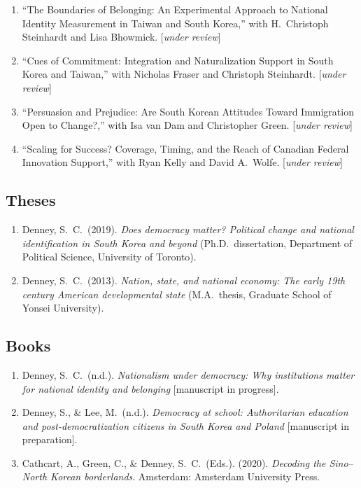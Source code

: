 \documentclass[11pt, a4paper]{article}
\begin{document}
\begin{enumerate}[itemsep=0.15em]
  \item ``The Boundaries of Belonging: An Experimental Approach to National Identity Measurement in Taiwan and South Korea,'' with H.\ Christoph Steinhardt and Lisa Bhowmick. [\textit{under review}]

  \item ``Cues of Commitment: Integration and Naturalization Support in South Korea and Taiwan,'' with Nicholas Fraser and Christoph Steinhardt. [\textit{under review}]

  \item ``Persuasion and Prejudice: Are South Korean Attitudes Toward Immigration Open to Change?,'' with Isa van Dam and Christopher Green. [\textit{under review}]

  \item ``Scaling for Success? Coverage, Timing, and the Reach of Canadian Federal Innovation Support,'' with Ryan Kelly and David A.\ Wolfe. [\textit{under review}]
\end{enumerate}

\subsection{Theses}

\begin{enumerate}[itemsep=0.15em]
  \item Denney, S.\ C.\ (2019). \textit{Does democracy matter? Political change and national identification in South Korea and beyond} (Ph.D.\ dissertation, Department of Political Science, University of Toronto).

  \item Denney, S.\ C.\ (2013). \textit{Nation, state, and national economy: The early 19th century American developmental state} (M.A.\ thesis, Graduate School of Yonsei University).
\end{enumerate}

\subsection{Books}

\begin{enumerate}[itemsep=0.15em]
  \item Denney, S.\ C.\ (n.d.). \textit{Nationalism under democracy: Why institutions matter for national identity and belonging} [manuscript in progress].

  \item Denney, S., \& Lee, M.\ (n.d.). \textit{Democracy at school: Authoritarian education and post-democratization citizens in South Korea and Poland} [manuscript in preparation].

  \item Cathcart, A., Green, C., \& Denney, S.\ C.\ (Eds.). (2020). \textit{Decoding the Sino--North Korean borderlands}. Amsterdam: Amsterdam University Press.
\end{enumerate}
\end{document}
